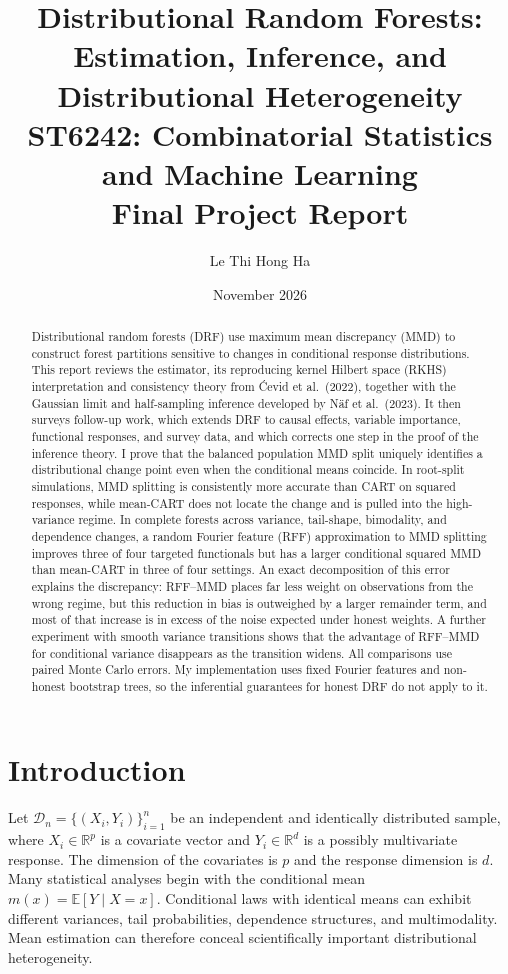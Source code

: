 \documentclass[12pt,a4paper]{article}
\title{\Large \textbf{Distributional Random Forests:}\\
 Estimation, Inference, and Distributional Heterogeneity\\[4pt]
 \large ST6242: Combinatorial Statistics and Machine Learning\\
 \large Final Project Report}
\author{Le Thi Hong Ha}
\date{November 2026}
\newcommand{\E}{\mathbb E}
\newcommand{\R}{\mathbb R}
\newcommand{\1}{\mathbf 1}
\begin{document}
\maketitle

\begin{abstract}
Distributional random forests (DRF) use maximum mean discrepancy (MMD) to construct forest partitions sensitive to changes in conditional response distributions. This report reviews the estimator, its reproducing kernel Hilbert space (RKHS) interpretation and consistency theory from \'{C}evid et al.\ (2022), together with the Gaussian limit and half-sampling inference developed by N\"af et al.\ (2023). It then surveys follow-up work, which extends DRF to causal effects, variable importance, functional responses, and survey data, and which corrects one step in the proof of the inference theory. I prove that the balanced population MMD split uniquely identifies a distributional change point even when the conditional means coincide. In root-split simulations, MMD splitting is consistently more accurate than CART on squared responses, while mean-CART does not locate the change and is pulled into the high-variance regime. In complete forests across variance, tail-shape, bimodality, and dependence changes, a random Fourier feature (RFF) approximation to MMD splitting improves three of four targeted functionals but has a larger conditional squared MMD than mean-CART in three of four settings. An exact decomposition of this error explains the discrepancy: RFF--MMD places far less weight on observations from the wrong regime, but this reduction in bias is outweighed by a larger remainder term, and most of that increase is in excess of the noise expected under honest weights. A further experiment with smooth variance transitions shows that the advantage of RFF--MMD for conditional variance disappears as the transition widens. All comparisons use paired Monte Carlo errors. My implementation uses fixed Fourier features and non-honest bootstrap trees, so the inferential guarantees for honest DRF do not apply to it.
\end{abstract}

\section{Introduction}\label{sec:intro}
Let $\mathcal D_n=\{(X_i,Y_i)\}_{i=1}^n$ be an independent and identically distributed sample, where $X_i\in\R^p$ is a covariate vector and $Y_i\in\R^d$ is a possibly multivariate response. The dimension of the covariates is $p$ and the response dimension is $d$. Many statistical analyses begin with the conditional mean $m(x)=\E[Y\mid X=x]$. Conditional laws with identical means can exhibit different variances, tail probabilities, dependence structures, and multimodality. Mean estimation can therefore conceal scientifically important distributional heterogeneity.
\end{document}
